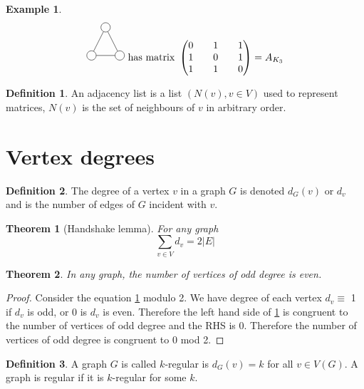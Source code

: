 \documentclass{article}
\newtheorem*{thm}{Theorem}
\theoremstyle{definition}
\newtheorem*{defn}{Definition}
\newtheorem*{ex}{Example}
\begin{document}
\begin{ex}
$$
\begin{tikzpicture}
  \node[draw,circle] (G-1) at (-0.5,0) {};
  \node[draw,circle] (G-2) at (0.5,0) {};
  \node[draw,circle] (G-3) at (0,1) {};
  \draw (G-1) -- (G-2) -- (G-3) -- (G-1);
\end{tikzpicture}
\text{ has matrix }
\begin{pmatrix}
0 && 1 && 1 \\
1 && 0 && 1 \\
1 && 1 && 0 
\end{pmatrix} = A_{K_{3}}$$
\end{ex}

\begin{defn}
An adjacency list is a list $(N(v),v\in V)$ used to represent matrices, $N(v)$ is the set of neighbours of $v$ in arbitrary order.
\end{defn}

\section{Vertex degrees}

\begin{defn}
The degree of a vertex $v$ in a graph $G$ is denoted $d_G(v)$ or $d_v$ and is the number of edges of $G$ incident with $v$.
\end{defn}

\begin{thm}[Handshake lemma]
For any graph
\label{eq:hand}
\begin{equation}
\sum_{v\in V}d_v = 2|E|
\end{equation}
\end{thm}

\begin{thm}
In any graph, the number of vertices of odd degree is even.
\end{thm}

\begin{proof}
Consider the equation \ref{eq:hand} modulo 2.
We have degree of each vertex $d_v \equiv$ 1 if $d_v$ is odd, or 0 is $d_v$ is even.
Therefore the left hand side of \ref{eq:hand} is congruent to the number of vertices of odd degree and the RHS is 0.
Therefore the number of vertices of odd degree is congruent to 0 mod 2.
\end{proof}

\begin{defn}
A graph $G$ is called $k$-regular is $d_G(v) = k$ for all $v\in V(G)$.
A graph is regular if it is $k$-regular for some $k$.
\end{defn}
\end{document}
